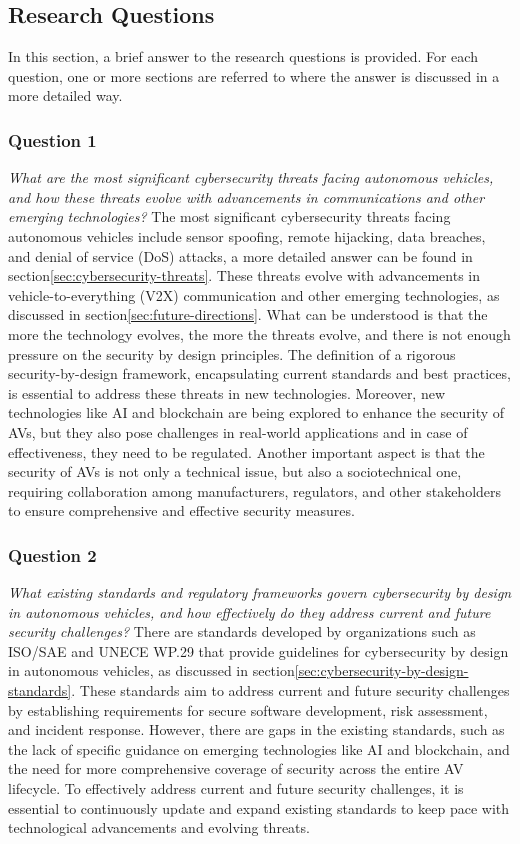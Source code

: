 \subsection{Research Questions}\label{subsec:research-questions}
In this section, a brief answer to the research questions is provided.
For each question, one or more sections are referred to where the answer is discussed in a more detailed way.

\subsubsection{Question 1}
\textit{What are the most significant cybersecurity threats facing autonomous vehicles, and how these threats evolve with advancements in communications and other emerging technologies?}
The most significant cybersecurity threats facing autonomous vehicles include sensor spoofing, remote hijacking, data breaches, and denial of service (DoS) attacks,
a more detailed answer can be found in section\ref{sec:cybersecurity-threats}.
These threats evolve with advancements in vehicle-to-everything (V2X) communication and other emerging technologies, as discussed in section\ref{sec:future-directions}.
What can be understood is that the more the technology evolves, the more the threats evolve, and there is not enough pressure on the security by design principles.
The definition of a rigorous security-by-design framework, encapsulating current standards and best practices, is essential to address these threats in new technologies.
Moreover, new technologies like AI and blockchain are being explored to enhance the security of AVs, but they also pose challenges in real-world applications and in case of effectiveness, they need to be regulated.
Another important aspect is that the security of AVs is not only a technical issue, but also a sociotechnical one, requiring collaboration among manufacturers, regulators, and other stakeholders to ensure comprehensive and effective security measures.

\subsubsection{Question 2}
\textit{What existing standards and regulatory frameworks govern cybersecurity by design in autonomous vehicles, and how effectively do they address current and future security challenges?}
There are standards developed by organizations such as ISO/SAE and UNECE WP.29 that provide guidelines for cybersecurity by design in autonomous vehicles, as discussed in section\ref{sec:cybersecurity-by-design-standards}.
These standards aim to address current and future security challenges by establishing requirements for secure software development, risk assessment, and incident response.
However, there are gaps in the existing standards, such as the lack of specific guidance on emerging technologies like AI and blockchain, and the need for more comprehensive coverage of security across the entire AV lifecycle.
To effectively address current and future security challenges, it is essential to continuously update and expand existing standards to keep pace with technological advancements and evolving threats.

